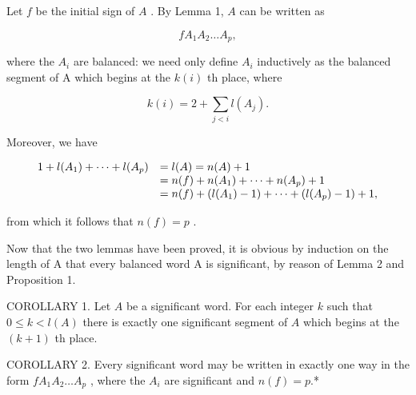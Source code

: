 Let \(f\) be the initial sign of \(A\) . By Lemma 1, \(A\) can be written as

\[
f A _ {1} A _ {2} \dots A _ {p},
\]

where the \(A_{i}\) are balanced: we need only define \(A_{i}\) inductively as the balanced segment of A which begins at the \(k(i)\) th place, where

\[
k (i) = 2 + \sum_ {j <   i} l (A _ {j}).
\]

Moreover, we have

\[
\begin{array}{r l} 1 + l (A _ {1}) + \dots + l (A _ {p}) & = l (A) = n (A) + 1 \\ & = n (f) + n (A _ {1}) + \dots + n (A _ {p}) + 1 \\ & = n (f) + (l (A _ {1}) - 1) + \dots + (l (A _ {p}) - 1) + 1, \end{array}
\]

from which it follows that \(n(f) = p\) .

Now that the two lemmas have been proved, it is obvious by induction on the length of A that every balanced word A is significant, by reason of Lemma 2 and Proposition 1.

COROLLARY 1. Let \(A\) be a significant word. For each integer \(k\) such that \(0 \leqslant k < l(A)\) there is exactly one significant segment of \(A\) which begins at the \((k + 1)\) th place.

COROLLARY 2. Every significant word may be written in exactly one way in the form \(fA_{1}A_{2}\ldots A_{p}\) , where the \(A_{i}\) are significant and \(n(f) = p\).*

